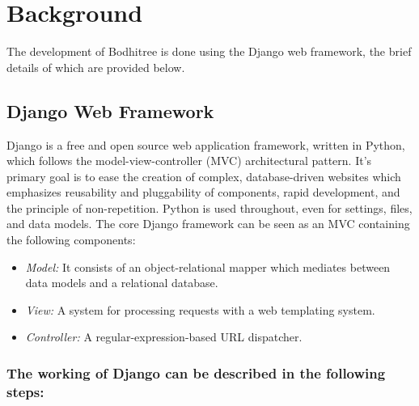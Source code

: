 \section{Background}

The development of Bodhitree is done using the Django web framework, the brief details of which are provided below.

\subsection{Django Web Framework}

\hspace{0.35cm} Django is a free and open source web application framework, written in Python, which follows the model-view-controller (MVC) architectural pattern.
It's primary goal is to ease the creation of complex, database-driven websites which emphasizes reusability and pluggability of components, rapid development, and the principle of non-repetition. Python is used throughout, even for settings, files, and data models. The core Django framework can be seen as an MVC containing the following components:
\begin{itemize}
	\item \emph{Model:} It consists of an object-relational mapper which mediates between data models and a relational database.
	\item \emph{View:} A system for processing requests with a web templating system.
	\item \emph{Controller:} A regular-expression-based URL dispatcher.
\end{itemize}

\subsubsection*{The working of Django can be described in the following steps:}

